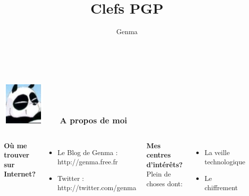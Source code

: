 \documentclass{beamer}
\title[Clefs PGP]{Clefs PGP}
\author{Genma}
\begin{document}
\begin{frame}
	\titlepage
	\vfill
	\begin{center}
		\\[2.5ex]
		{\tiny\CcNote{\CcLongnameByNcSa}}
		\vspace*{-2.5ex}
	\end{center}
\end{frame}





\begin{frame}
\frametitle{\includegraphics[scale=0.4]{./Genma.jpg} \ \ \  A propos de moi  }
\begin{columns}[c] 

\textbf{Où me trouver sur Internet?}
\begin{itemize}
\item Le Blog de Genma : http://genma.free.fr
\item Twitter : http://twitter.com/genma
\end{itemize}

\textbf{Mes centres d'intérêts?}
\\ Plein de choses dont:
\begin{itemize}
\item La veille technologique
\item Le chiffrement
\end{itemize}

\includegraphics[width=5cm,height=5cm]{blog.png} 

\end{columns}
\end{frame}
\end{document}
